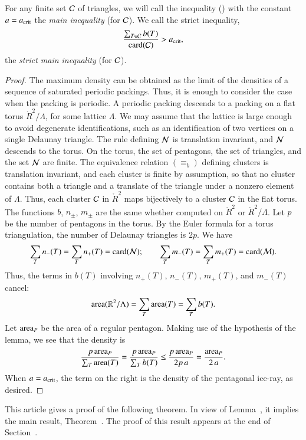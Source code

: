 For any finite set $\mathcal C$ of triangles, we will call the inequality
() with the constant $a=a_\text{crit}$ the {\it main inequality}
(for $\mathcal C$).  We call the strict inequality,
\begin{equation}\libel{eqn:strict-main}
\frac{\sum_{T\in \C} b(T)}{\card(\C)} > \acrit,
\end{equation}
the {\it strict main inequality} (for $\mathcal C$).

\begin{proof} The maximum density can be obtained as the limit of the
  densities of a sequence of saturated periodic packings.  Thus, it is
  enough to consider the case when the packing is periodic.  A
  periodic packing descends to a packing on a flat torus
  $\ring{R}^2/\Lambda$, for some lattice $\Lambda$. We may assume that
  the lattice is large enough to avoid degenerate identifications, such
  as an identification of two vertices on a single Delaunay triangle.
  The rule defining
  $\mathcal N$ is translation invariant, and $\mathcal N$ descends to the torus.  On
  the torus, the set of pentagons, the set of triangles, and the set
  $\mathcal N$ are finite.  The equivalence relation $(\equiv_b)$ defining
  clusters is translation invariant, and each cluster is finite by
  assumption, so that no cluster contains both a triangle and a
  translate of the triangle under a nonzero element of $\Lambda$.
  Thus, each cluster $\mathcal C$ in $\ring{R}^2$ maps bijectively to a
  cluster $\mathcal C$ in the flat torus.  The functions $b$, $n_\pm$, $m_\pm$
  are the same whether computed on $\ring{R}^2$ or
  $\ring{R}^2/\Lambda$.  Let $p$ be the number of pentagons in the
  torus.  By the Euler formula for a torus triangulation, the number
  of Delaunay triangles is $2p$.  We have
\[
\sum_{T} n_-(T) =  \sum_{T} n_+(T) = {\operatorname{card}}(\mathcal N);\qquad
\sum_{T} m_-(T) =  \sum_{T} m_+(T) = {\operatorname{card}}(\mathcal M).
\]
Thus, the terms in $b(T)$ involving $n_+(T)$, $n_-(T)$, $m_+(T)$,
and $m_-(T)$ cancel:
\[
{\operatorname{area}}(\mathbb{R}^2/\Lambda) = \sum_T {\operatorname{area}}(T) = \sum_T b(T).
\]    
Let ${\operatorname{area}}_P$ be the area of a regular pentagon.  Making use of the
hypothesis of the lemma, we see that the density is
\[
\frac{p\, {\operatorname{area}}_P}{\sum_T {\operatorname{area}}(T)} 
=\frac{p\, {\operatorname{area}}_P}{\sum_T b(T)} \le\frac{p\, {\operatorname{area}}_P}{2 p\, a} 
= \frac{{\operatorname{area}}_P}{2\, a}.
\]
When $a=a_\text{crit}$, the term on the right is the density of the
pentagonal ice-ray, as desired.
\end{proof}

This article gives a proof of the following theorem. In view of
Lemma~, it implies the main result,
Theorem~.  The proof of this result appears at the end
of Section~.

